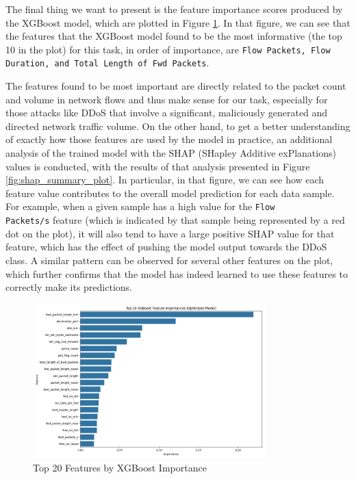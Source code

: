 The final thing we want to present is the feature importance scores produced by the XGBoost model, which are plotted in Figure \ref{fig:xgboost_feature_importance}. In that figure, we can see that the features that the XGBoost model found to be the most informative (the top 10 in the plot) for this task, in order of importance, are \texttt{Flow Packets, Flow Duration, and Total Length of Fwd Packets}.

The features found to be most important are directly related to the packet count and volume in network flows and thus make sense for our task, especially for those attacks like DDoS that involve a significant, maliciously generated and directed network traffic volume. On the other hand, to get a better understanding of exactly how those features are used by the model in practice, an additional analysis of the trained model with the SHAP (SHapley Additive exPlanations) values is conducted, with the results of that analysis presented in Figure \ref{fig:shap_summary_plot}. In particular, in that figure, we can see how each feature value contributes to the overall model prediction for each data sample. For example, when a given sample has a high value for the \texttt{Flow\\ Packets/s} feature (which is indicated by that sample being represented by a red dot on the plot), it will also tend to have a large positive SHAP value for that feature, which has the effect of pushing the model output towards the DDoS class. A similar pattern can be observed for several other features on the plot, which further confirms that the model has indeed learned to use these features to correctly make its predictions.


\begin{figure}[H]
	\centering
	\includegraphics[width=0.8\textwidth]{assets/figures/results/xgboost_feature_importance.png}
	\caption{Top 20 Features by XGBoost Importance}
	\label{fig:xgboost_feature_importance}
\end{figure}

